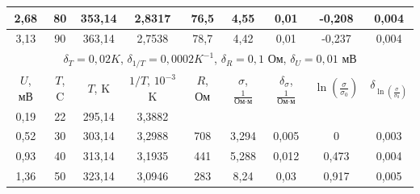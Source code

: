 \documentclass[a4paper, 12pt]{article}%
\begin{document}
\begin{table}[h]
\begin{tabular}{|c|c|c|c|c|c|c|c|c|}
2,68    & 80     & 353,14 & 2,8317            & 76,5    & 4,55                                                & 0,01                                                         & -0,208                                                                            & 0,004                                              \\ \hline
3,13    & 90     & 363,14 & 2,7538            & 78,7    & 4,42                                                & 0,01                                                         & -0,237                                                                            & 0,004                                              \\ \hline
\multicolumn{9}{|c|}{$\delta_T = 0,02 K$,   $\delta_{1/T} = 0,0002 K^{-1}$, $\delta_R = 0,1$ Ом, $\delta_U = 0,01$ мВ}                                                                                                                                                                                                \\ \hline
$U$, мВ & $T$, C & $T$, K & $1/T$, $10^{-3}$K & $R$, Ом & $\sigma$, $\frac{1}{\text{Ом} \cdot \text{м}}$      & $\delta_{\sigma}$, $\frac{1}{\text{Ом} \cdot \text{м}}$      & $\ln\left(\frac{\sigma}{\sigma_0}\right)$                                         & $\delta_{\ln\left(\frac{\sigma}{\sigma_0}\right)}$ \\ \hline
0,19    & 22     & 295,14 & 3,3882            &         &                                                     &                                                              &                                                                                   &                                                    \\ \hline
0,52    & 30     & 303,14 & 3,2988            & 708     & 3,294                                               & 0,005                                                        & 0                                                                                 & 0,003                                              \\ \hline
0,93    & 40     & 313,14 & 3,1935            & 441     & 5,288                                               & 0,012                                                        & 0,473                                                                             & 0,004                                              \\ \hline
1,36    & 50     & 323,14 & 3,0946            & 283     & 8,24                                                & 0,03                                                         & 0,917                                                                             & 0,005                                              \\ \hline

\end{tabular}
\end{table}
\end{document}
